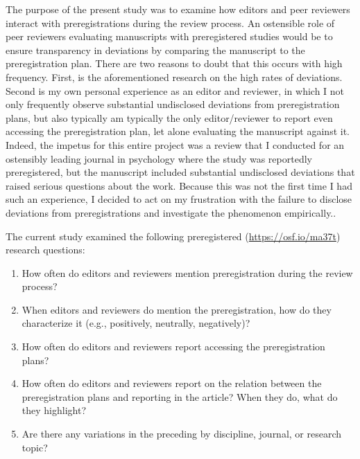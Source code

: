 \documentclass[authordate, empirical]{jote-new-article}
\begin{document}
	The purpose of the present study was to examine how editors and peer reviewers interact with preregistrations during the review process. An ostensible role of peer reviewers evaluating manuscripts with preregistered studies would be to ensure transparency in deviations by comparing the manuscript to the preregistration plan. There are two reasons to doubt that this occurs with high frequency. First, is the aforementioned research on the high rates of deviations. Second is my own personal experience as an editor and reviewer, in which I not only frequently observe substantial undisclosed deviations from preregistration plans, but also typically am typically the only editor/reviewer to report even accessing the preregistration plan, let alone evaluating the manuscript against it. Indeed, the impetus for this entire project was a review that I conducted for an ostensibly leading journal in psychology where the study was reportedly preregistered, but the manuscript included substantial undisclosed deviations that raised serious questions about the work. Because this was not the first time I had such an experience, I decided to act on my frustration with the failure to disclose deviations from preregistrations and investigate the phenomenon empirically..



	The current study examined the following preregistered (\url{https://osf.io/ma37t}) research questions:

	\begin{enumerate}


		\item How often do editors and reviewers mention preregistration during the review process?



		\item
		When editors and reviewers do mention the preregistration, how do they characterize it (e.g., positively, neutrally, negatively)?



		\item How often do editors and reviewers report accessing the preregistration plans?



		\item
		How often do editors and reviewers report on the relation between the preregistration plans and reporting in the article? When they do, what do they highlight?



		\item Are there any variations in the preceding by discipline, journal, or research topic?


	\end{enumerate}
\end{document}
